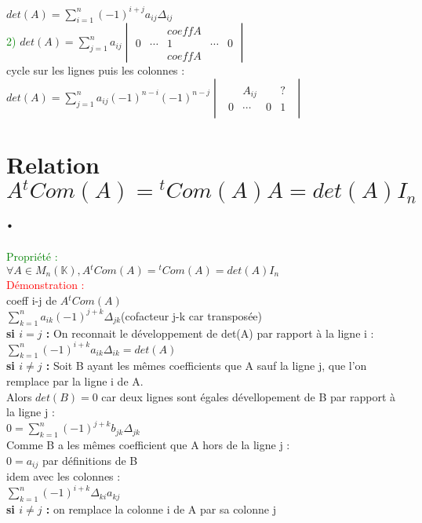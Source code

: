 \documentclass{article}
\begin{document}
    $det(A)=\sum_{i=1}^n (-1)^{i+j} a_{ij} \Delta_{ij}$ \\
    \textcolor{green}{2)} $det(A)= \sum_{j=1}^n a_{ij} \begin{vmatrix} & & coeff A \\ 0 & \cdots & 1 & \cdots &0 \\  & & coeff A \end{vmatrix}$ \\
    cycle sur les lignes puis les colonnes  : \\
    $det(A)=\sum_{j=1}^n a_{ij} (-1)^{n-i}(-1)^{n-j} \begin{vmatrix} \begin{array}{lcr|r}
      & A_{ij} &  &  ?\\
      \hline 0 & \cdots & 0  & 1
        \end{array} \end{vmatrix}   $
\section{Relation $A {}^tCom(A)={}^tCom(A)A=det(A)I_n$.}
      \textcolor{green}{Propriété :} \\
      $\forall A \in M_n(\mathbb K),  A {}^t Com(A)= {}^t Com(A)= det(A)I_n$ \\
      \textcolor{red}{Démonstration : } \\
      coeff i-j de $A{}^t Com(A)$ \\
      $\sum_{k=1}^n a_{ik} (-1)^{j+k} \Delta_{jk}$(cofacteur j-k car transposée) \\
      {\bf si \boldmath $i = j$ :} On reconnait le développement de det(A) par rapport à la ligne i : \\
      $\sum_{k=1}^n (-1)^{i+k}a_{ik}\Delta_{ik}=det(A)$ \\
      {\bf si \boldmath $i \neq j$ :} Soit B ayant les mêmes coefficients  que A sauf la ligne j, que l'on remplace par la ligne i de A. \\
      Alors $det(B) = 0$ car deux lignes sont égales dévellopement de B par rapport à la ligne j : \\
      $0=\sum_{k=1}^n (-1)^{j+k} b_{jk} \Delta_{jk}$ \\
      Comme B a les mêmes coefficient que A hors de la ligne j : \\
      $0=a_{ij}$ par définitions de B \\
      idem avec les colonnes : \\
      $\sum_{k=1}^n (-1)^{i+k} \Delta_{ki} a_{kj}$ \\
      {\bf \boldmath si $i\neq j$ :} on remplace la colonne i de A par sa colonne j
\end{document}
